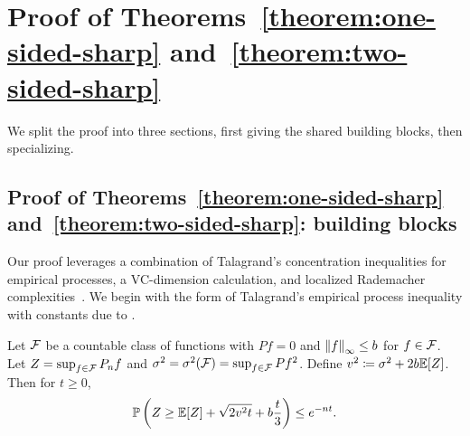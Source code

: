\documentclass{article}
\newcommand{\radphi}{b_{\phi}}
\newcommand{\scorerv}{S}
\begin{document}

\section{Proof of Theorems~\ref{theorem:one-sided-sharp}
  and~\ref{theorem:two-sided-sharp}}
\label{sec:proof-sharp}

We split the proof into three sections, first giving the shared
building blocks, then specializing.

\subsection{Proof of Theorems~\ref{theorem:one-sided-sharp}
  and~\ref{theorem:two-sided-sharp}: building blocks}
\label{sec:proof-sharp-building-blocks}

Our proof leverages a combination of Talagrand's concentration inequalities
for empirical processes, a VC-dimension calculation, and localized
Rademacher complexities~\cite{BartlettBoMe05, Koltchinskii06a}.
We begin with the form of Talagrand's empirical
process inequality with constants due to \citet{Bousquet02thesis}.

\begin{lemma}
  \label{lemma:talagrand}
  Let $\mathcal{F}$ be a countable class of functions with
  $Pf = 0$ and $\left\|{f}\right\|_\infty \le b$ for $f \in \mathcal{F}$. Let $Z = \sup_{f \in \mathcal{F}}
  P_n f$ and $\sigma^2 = \sigma^2(\mathcal{F}) = \sup_{f \in \mathcal{F}} Pf^2$.
  Define $v^2 \coloneqq \sigma^2 + 2b \mathbb{E}[Z]$.
  Then for $t \ge 0$,
  \begin{equation*}
    \mathbb{P}\left(Z \ge \mathbb{E}[Z] + \sqrt{2 v^2 t} + b\frac{t}{3}\right)
    \le e^{-nt}.
  \end{equation*}
\end{lemma}
\end{document}
